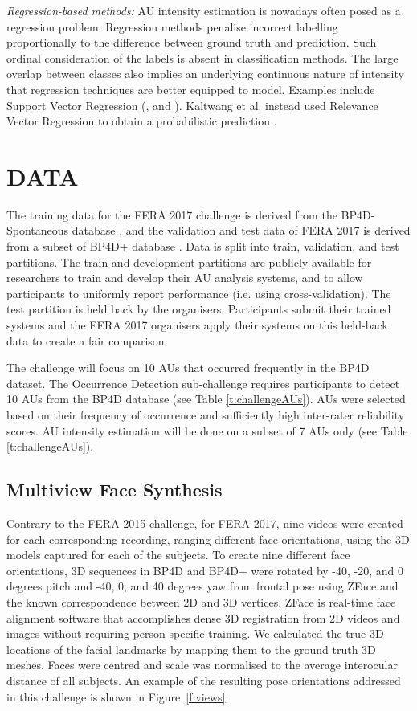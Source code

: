 \documentclass[a4paper, 10pt, conference]{ieeeconf}      \usepackage{FG2017}
\begin{document}
\textit{Regression-based methods:} AU intensity estimation is nowadays often posed as a regression problem. Regression methods penalise incorrect labelling proportionally to the difference between ground truth and prediction. Such ordinal consideration of the labels is absent in classification methods. The large overlap between classes also implies an underlying continuous nature of intensity that regression techniques are better equipped to model. Examples include Support Vector Regression (\cite{JeniEtAl13}, \cite{Girard2014} and \cite{SavranEtAl11}). Kaltwang et al.   instead used Relevance Vector Regression to obtain a probabilistic prediction \cite{KaltwangEtAl12}. 

\section{DATA}
\noindent The training data for the FERA 2017 challenge is derived from the BP4D-Spontaneous database \cite{ZhangEtAl2014_BHS}, and the validation and test data of FERA 2017 is derived from a subset of BP4D+ database \cite{ZhangEtAl2016_MSE}. Data is split into train, validation, and test partitions. The train and development partitions are publicly available for researchers to train and develop their AU analysis systems, and to allow participants to uniformly report performance (i.e. using cross-validation). The test partition is held back by the organisers. Participants submit their trained systems and the FERA 2017 organisers apply their systems on this held-back data to create a fair comparison.

The challenge will focus on 10 AUs that occurred frequently in the BP4D dataset. The Occurrence Detection sub-challenge requires participants to detect 10 AUs from the BP4D database (see Table \ref{t:challengeAUs}).  AUs were selected based on their frequency of occurrence and sufficiently high inter-rater reliability scores. AU intensity estimation will be done on a subset of 7 AUs only (see Table \ref{t:challengeAUs}).



\subsection{Multiview Face Synthesis}
\label{ssec:mview}
\noindent Contrary to the FERA 2015 challenge, for FERA 2017, nine videos were created for each corresponding recording, ranging different face orientations, using the 3D models captured for each of the subjects. To create nine different face orientations, 3D sequences in BP4D and BP4D+ were rotated by -40, -20, and 0 degrees pitch and -40, 0, and 40 degrees yaw from frontal pose using ZFace \cite{Jeni16ImaVis_ZFace} and the known correspondence between 2D and 3D vertices. ZFace is real-time face alignment software that accomplishes dense 3D registration from 2D videos and images without requiring person-specific training.  We calculated the true 3D locations of the facial landmarks by mapping them to the ground truth 3D meshes. Faces were centred and scale was normalised to the average interocular distance of all subjects. An example of the resulting pose orientations addressed in this challenge is shown in Figure~\ref{f:views}.
\end{document}
